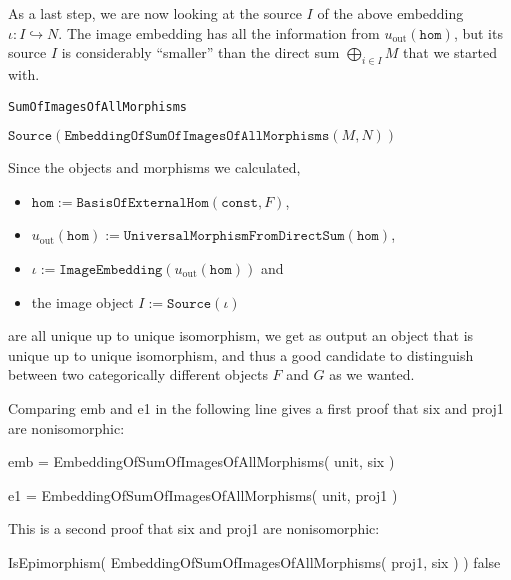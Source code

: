 As a last step, we are now looking at the source $I$ of the above embedding $\iota : I \hookrightarrow N$. The image
embedding has all the information from $u_{\text{out}}(\mathtt{hom})$, but its source $I$ is considerably ``smaller'' than the
direct sum $\bigoplus_{i\in I} M$ that we started with. 

\begin{algorithm}[H]\capstart
    \caption{\texttt{SumOfImagesOfAllMorphisms}}\label{algo:SumOfImagesOfAllMorphisms}
	\BlankLine
	\Return $\mathtt{Source}( \mathtt{EmbeddingOfSumOfImagesOfAllMorphisms}( M, N ) )$\;
\end{algorithm}

Since the objects and morphisms we calculated,
\begin{itemize}
\item $\mathtt{hom} := \mathtt{BasisOfExternalHom}(\mathtt{const},F)$,
\item $u_{\text{out}}(\mathtt{hom}) := \mathtt{UniversalMorphismFromDirectSum}(\mathtt{hom})$,
\item $\iota := \mathtt{ImageEmbedding}(u_{\text{out}}(\mathtt{hom}))$ and
\item the image object $I := \mathtt{Source}(\iota)$
\end{itemize}
are all unique up to unique isomorphism, we get as output an object that is unique up to unique isomorphism, and thus a good candidate to distinguish
between two categorically different objects $F$ and $G$ as we wanted.

\begin{example}
Comparing emb and e1 in the following line gives a first proof that six and proj1 are nonisomorphic:

emb = EmbeddingOfSumOfImagesOfAllMorphisms( unit, six )

e1 = EmbeddingOfSumOfImagesOfAllMorphisms( unit, proj1 )

This is a second proof that six and proj1 are nonisomorphic:

IsEpimorphism( EmbeddingOfSumOfImagesOfAllMorphisms( proj1, six ) )
false
\end{example}
